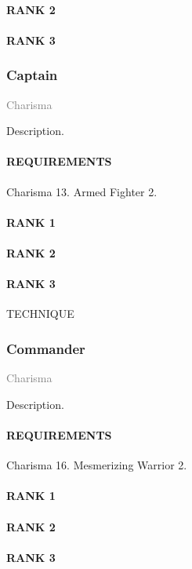 \paragraph{RANK 2} 
\paragraph{RANK 3} 

\subsubsection{Captain} \label{tal::captain}
\small{\textcolor{gray}{Charisma}}

\normalsize
Description.
\paragraph{REQUIREMENTS} Charisma 13. Armed Fighter 2.
\paragraph{RANK 1}
\paragraph{RANK 2}
\paragraph{RANK 3} TECHNIQUE

\subsubsection{Commander} \label{tal::commander}
\small{\textcolor{gray}{Charisma}}

\normalsize
Description.
\paragraph{REQUIREMENTS} Charisma 16. Mesmerizing Warrior 2.
\paragraph{RANK 1} 
\paragraph{RANK 2} 
\paragraph{RANK 3} %


